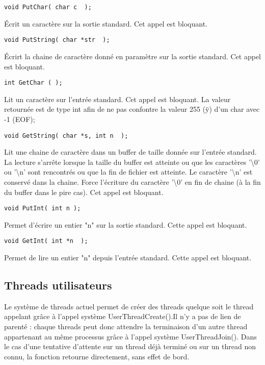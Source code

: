 \documentclass{article}
\begin{document}
\begin{verbatim}
void PutChar( char c  );
\end{verbatim}
Écrit un caractère sur la sortie standard. Cet appel est bloquant.

\begin{verbatim}
void PutString( char *str  );
\end{verbatim}
Écrirt la chaine de caractère donné en paramètre sur la sortie standard. Cet appel est bloquant.

\begin{verbatim}
int GetChar ( );
\end{verbatim}
Lit un caractère sur l'entrée standard. Cet appel est bloquant. La valeur retournée est de type int afin de ne pas confontre la valeur 255 (ÿ) d'un char avec -1 (EOF);

\begin{verbatim}
void GetString( char *s, int n  );
\end{verbatim}
Lit une chaine de caractère dans un buffer de taille donnée sur l'entrée standard. La lecture s'arrête lorsque la taille du buffer est atteinte ou que les caractères '\textbackslash 0' ou '\textbackslash n' sont rencontrés ou que la fin de fichier est atteinte. Le caractère '\textbackslash n' est conservé dans la chaine. Force l'écriture du caractère '\textbackslash 0' en fin de chaine (à la fin du buffer dans le pire cas). Cet appel est bloquant.

\begin{verbatim}
void PutInt( int n );
\end{verbatim}
Permet d'écrire un entier "n" sur la sortie standard. Cette appel est bloquant.


\begin{verbatim}
void GetInt( int *n  );
\end{verbatim}
Permet de lire un entier  "n" depuis l'entrée standard. Cette appel est bloquant.

\subsection{Threads utilisateurs}
Le système de threads actuel permet de créer des threads quelque soit le thread appelant grâce à l'appel système UserThreadCreate().Il n'y a pas de lien de parenté : chaque threads peut donc attendre la terminaison d'un autre thread appartenant au même processus grâce à l'appel système UserThreadJoin(). Dans le cas d'une tentative d'attente sur un thread déjà terminé ou sur un thread non connu, la fonction retourne directement, sans effet de bord.
\end{document}
